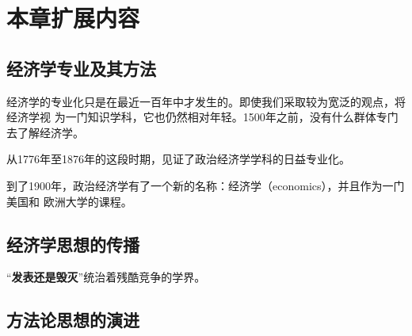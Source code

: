 \section{本章扩展内容}

\subsection{经济学专业及其方法}

经济学的专业化只是在最近一百年中才发生的。即使我们采取较为宽泛的观点，将经济学视
为一门知识学科，它也仍然相对年轻。1500年之前，没有什么群体专门去了解经济学。

从1776年至1876年的这段时期，见证了政治经济学学科的日益专业化。

到了1900年，政治经济学有了一个新的名称：经济学（economics），并且作为一门美国和
欧洲大学的课程。

\subsection{经济学思想的传播}

“\textbf{发表还是毁灭}”统治着残酷竞争的学界。

\subsection{方法论思想的演进}

